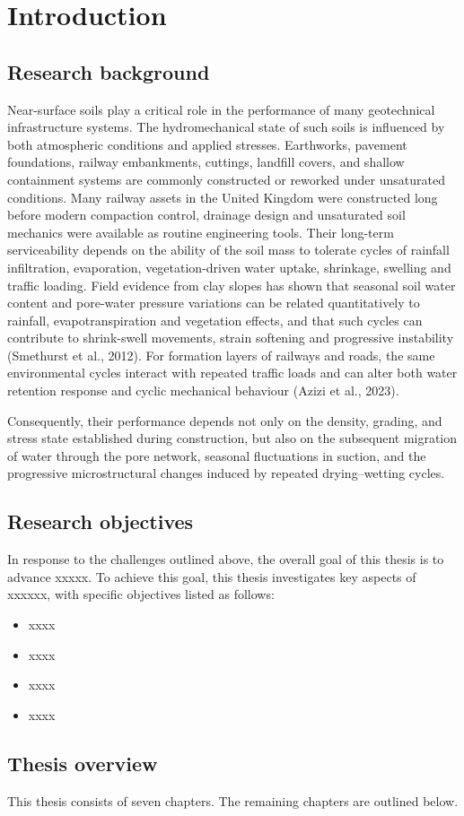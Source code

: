 \chapter{Introduction} \label{chap:one}
\section{Research background} \label{sec:1.1}
Near-surface soils play a critical role in the performance of many geotechnical infrastructure systems. The hydromechanical state of such soils is influenced by both atmospheric conditions and applied stresses. Earthworks, pavement foundations, railway embankments, cuttings, landfill covers, and shallow containment systems are commonly constructed or reworked under unsaturated conditions. Many railway assets in the United Kingdom were constructed long before modern compaction control, drainage design and unsaturated soil mechanics were available as routine engineering tools. Their long-term serviceability depends on the ability of the soil mass to tolerate cycles of rainfall infiltration, evaporation, vegetation-driven water uptake, shrinkage, swelling and traffic loading. Field evidence from clay slopes has shown that seasonal soil water content and pore-water pressure variations can be related quantitatively to rainfall, evapotranspiration and vegetation effects, and that such cycles can contribute to shrink-swell movements, strain softening and progressive instability (Smethurst et al., 2012). For formation layers of railways and roads, the same environmental cycles interact with repeated traffic loads and can alter both water retention response and cyclic mechanical behaviour (Azizi et al., 2023).



Consequently, their performance depends not only on the density, grading, and stress state established during construction, but also on the subsequent migration of water through the pore network, seasonal fluctuations in suction, and the progressive microstructural changes induced by repeated drying–wetting cycles.



\section{Research objectives} \label{sec:1.2}
In response to the challenges outlined above, the overall goal of this thesis is to advance xxxxx. To achieve this goal, this thesis investigates key aspects of xxxxxx, with specific objectives listed as follows:
\begin{itemize}
  \item xxxx
  \item xxxx
  \item xxxx
  \item xxxx
\end{itemize}

\section{Thesis overview}
This thesis consists of seven chapters. The remaining chapters are outlined below. \par
